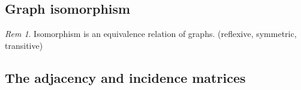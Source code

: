 \documentclass[11pt, fleqn, a4paper, landscape]{article}
\theoremstyle{plain} %
\theoremstyle{remark} %
\newtheorem{rem}[thm]{Rem}
\theoremstyle{definition} %
\newtheorem{defi}[thm]{Def}
\begin{document}
\begin{multicols}{5}
\subsection{Graph isomorphism}
\addtocounter{thm}{2}
\addtocounter{thm}{1}
\begin{rem}
Isomorphism is an equivalence relation of graphs. (reflexive, symmetric, transitive)
\end{rem}

\addtocounter{thm}{1}

\subsection{The adjacency and incidence matrices}


\addtocounter{thm}{2}
\addtocounter{thm}{1}


\end{multicols}
\end{document}
